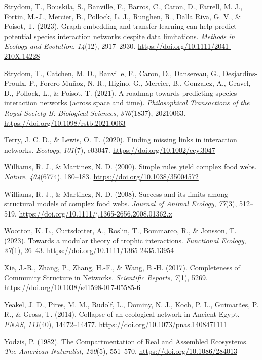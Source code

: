\documentclass[
]{article}
\newlength{\cslhangindent}
\newenvironment{CSLReferences}[2] %
 {\begin{list}{}{%
  \setlength{\itemindent}{0pt}
  \setlength{\leftmargin}{0pt}
  \setlength{\parsep}{0pt}
  \ifodd #1
   \setlength{\leftmargin}{\cslhangindent}
   \setlength{\itemindent}{-1\cslhangindent}
  \fi
  \setlength{\itemsep}{#2\baselineskip}}}
 {\end{list}}
\begin{document}
\begin{CSLReferences}{1}{0}
Strydom, T., Bouskila, S., Banville, F., Barros, C., Caron, D., Farrell,
M. J., Fortin, M.-J., Mercier, B., Pollock, L. J., Runghen, R., Dalla
Riva, G. V., \& Poisot, T. (2023). Graph embedding and transfer learning
can help predict potential species interaction networks despite data
limitations. \emph{Methods in Ecology and Evolution}, \emph{14}(12),
2917--2930. \url{https://doi.org/10.1111/2041-210X.14228}

Strydom, T., Catchen, M. D., Banville, F., Caron, D., Dansereau, G.,
Desjardins-Proulx, P., Forero-Muñoz, N. R., Higino, G., Mercier, B.,
Gonzalez, A., Gravel, D., Pollock, L., \& Poisot, T. (2021). A roadmap
towards predicting species interaction networks (across space and time).
\emph{Philosophical Transactions of the Royal Society B: Biological
Sciences}, \emph{376}(1837), 20210063.
\url{https://doi.org/10.1098/rstb.2021.0063}

Terry, J. C. D., \& Lewis, O. T. (2020). Finding missing links in
interaction networks. \emph{Ecology}, \emph{101}(7), e03047.
\url{https://doi.org/10.1002/ecy.3047}

Williams, R. J., \& Martinez, N. D. (2000). Simple rules yield complex
food webs. \emph{Nature}, \emph{404}(6774), 180--183.
\url{https://doi.org/10.1038/35004572}

Williams, R. J., \& Martinez, N. D. (2008). Success and its limits among
structural models of complex food webs. \emph{Journal of Animal
Ecology}, \emph{77}(3), 512--519.
\url{https://doi.org/10.1111/j.1365-2656.2008.01362.x}

Wootton, K. L., Curtsdotter, A., Roslin, T., Bommarco, R., \& Jonsson,
T. (2023). Towards a modular theory of trophic interactions.
\emph{Functional Ecology}, \emph{37}(1), 26--43.
\url{https://doi.org/10.1111/1365-2435.13954}

Xie, J.-R., Zhang, P., Zhang, H.-F., \& Wang, B.-H. (2017). Completeness
of {Community Structure} in {Networks}. \emph{Scientific Reports},
\emph{7}(1), 5269. \url{https://doi.org/10.1038/s41598-017-05585-6}

Yeakel, J. D., Pires, M. M., Rudolf, L., Dominy, N. J., Koch, P. L.,
Guimarães, P. R., \& Gross, T. (2014). Collapse of an ecological network
in {Ancient Egypt}. \emph{PNAS}, \emph{111}(40), 14472--14477.
\url{https://doi.org/10.1073/pnas.1408471111}

Yodzis, P. (1982). The {Compartmentation} of {Real} and {Assembled
Ecosystems}. \emph{The American Naturalist}, \emph{120}(5), 551--570.
\url{https://doi.org/10.1086/284013}

\end{CSLReferences}
\end{document}
